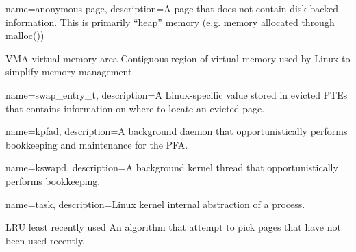 {
  name={anonymous page},
  description={A page that does not contain disk-backed information. This is
primarily ``heap'' memory (e.g. memory allocated through malloc())}
}

  {VMA}
  {virtual memory area}
  {Contiguous region of virtual memory used by Linux to simplify memory
   management.}

{
  name={swap\_entry\_t},
  description={A Linux-specific value stored in evicted PTEs that contains
information on where to locate an evicted page.}
}

{
  name={kpfad},
  description={A background daemon that opportunistically performs bookkeeping
  and maintenance for the PFA.}
}

{
  name={kswapd},
  description={A background kernel thread that opportunistically performs
    bookkeeping.}
}

{
  name={task},
  description={Linux kernel internal abstraction of a process.}
}

  {LRU}
  {least recently used}
  {An algorithm that attempt to pick pages that have not been used recently.}

